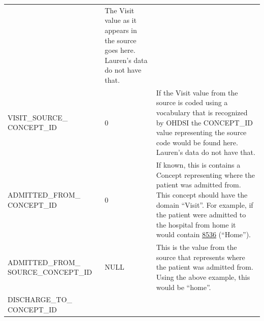 \documentclass[11pt]{book}
\theoremstyle{definition}
\theoremstyle{definition}
\theoremstyle{definition}
\theoremstyle{remark}
\begin{document}
\begin{longtable}[]{@{}lll@{}}
\begin{minipage}[t]{0.15\columnwidth}
\end{minipage} & \begin{minipage}[t]{0.49\columnwidth}\raggedright
The Visit value as it appears in the source goes here. Lauren's data do not have that.\strut
\end{minipage}\tabularnewline
\begin{minipage}[t]{0.28\columnwidth}\raggedright
VISIT\_SOURCE\_ CONCEPT\_ID\strut
\end{minipage} & \begin{minipage}[t]{0.15\columnwidth}\raggedright
0\strut
\end{minipage} & \begin{minipage}[t]{0.49\columnwidth}\raggedright
If the Visit value from the source is coded using a vocabulary that is recognized by OHDSI the CONCEPT\_ID value representing the source code would be found here. Lauren's data do not have that.\strut
\end{minipage}\tabularnewline
\begin{minipage}[t]{0.28\columnwidth}\raggedright
ADMITTED\_FROM\_ CONCEPT\_ID\strut
\end{minipage} & \begin{minipage}[t]{0.15\columnwidth}\raggedright
0\strut
\end{minipage} & \begin{minipage}[t]{0.49\columnwidth}\raggedright
If known, this is contains a Concept representing where the patient was admitted from. This concept should have the domain ``Visit''. For example, if the patient were admitted to the hospital from home it would contain \href{http://athena.ohdsi.org/search-terms/terms/8536}{8536} (``Home'').\strut
\end{minipage}\tabularnewline
\begin{minipage}[t]{0.28\columnwidth}\raggedright
ADMITTED\_FROM\_ SOURCE\_CONCEPT\_ID\strut
\end{minipage} & \begin{minipage}[t]{0.15\columnwidth}\raggedright
NULL\strut
\end{minipage} & \begin{minipage}[t]{0.49\columnwidth}\raggedright
This is the value from the source that represents where the patient was admitted from. Using the above example, this would be ``home''.\strut
\end{minipage}\tabularnewline
\begin{minipage}[t]{0.28\columnwidth}\raggedright
DISCHARGE\_TO\_ CONCEPT\_ID\strut
\end{minipage} & \begin{minipage}[t]{0.15\columnwidth}\raggedright

\end{minipage}
\end{longtable}
\end{document}
